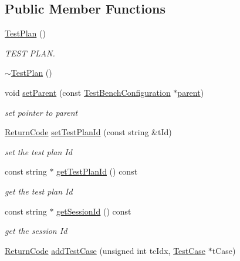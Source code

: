 \subsection*{Public Member Functions}
\begin{DoxyCompactItemize}
\item 
\hyperlink{classit_1_1testbench_1_1data_1_1TestPlan_ad33876e2df1471adc6feaecb4be01170}{Test\-Plan} ()
\begin{DoxyCompactList}\small\item\em T\-E\-S\-T P\-L\-A\-N. \end{DoxyCompactList}\item 
\hyperlink{classit_1_1testbench_1_1data_1_1TestPlan_a4d5b6ca833ea746153a7eab0b3e01e9d}{$\sim$\-Test\-Plan} ()
\item 
void \hyperlink{classit_1_1testbench_1_1data_1_1TestPlan_a56a7b7f2aec78d8dfba3a4f2110eedf6}{set\-Parent} (const \hyperlink{classit_1_1testbench_1_1data_1_1TestBenchConfiguration}{Test\-Bench\-Configuration} $\ast$\hyperlink{classit_1_1testbench_1_1data_1_1TestPlan_a79f502dcaa5c97db247d81c4808da43d}{parent})
\begin{DoxyCompactList}\small\item\em set pointer to parent \end{DoxyCompactList}\item 
\hyperlink{structit_1_1testbench_1_1data_1_1ReturnCode}{Return\-Code} \hyperlink{classit_1_1testbench_1_1data_1_1TestPlan_aaf7ae0fd7ba3aeaf9716c00c7461bd5c}{set\-Test\-Plan\-Id} (const string \&t\-Id)
\begin{DoxyCompactList}\small\item\em set the test plan Id \end{DoxyCompactList}\item 
const string $\ast$ \hyperlink{classit_1_1testbench_1_1data_1_1TestPlan_a23d8699783d6d8cd52426e1c5f0fafb9}{get\-Test\-Plan\-Id} () const 
\begin{DoxyCompactList}\small\item\em get the test plan Id \end{DoxyCompactList}\item 
const string $\ast$ \hyperlink{classit_1_1testbench_1_1data_1_1TestPlan_a2fd269c840f4ea2ebf12d801f257a67c}{get\-Session\-Id} () const 
\begin{DoxyCompactList}\small\item\em get the session Id \end{DoxyCompactList}\item 
\hyperlink{structit_1_1testbench_1_1data_1_1ReturnCode}{Return\-Code} \hyperlink{classit_1_1testbench_1_1data_1_1TestPlan_a4613f6641ce2f7eae4f2b0b2e32ac6f3}{add\-Test\-Case} (unsigned int tc\-Idx, \hyperlink{classit_1_1testbench_1_1data_1_1TestCase}{Test\-Case} $\ast$t\-Case)

\end{DoxyCompactItemize}
